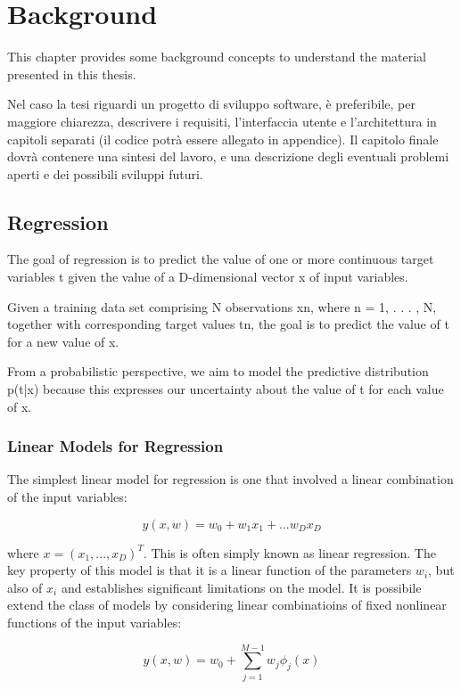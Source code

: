 \chapter{Background}
\label{chap:background}
This chapter provides some background concepts to understand the material 
presented in this thesis. 

Nel caso la tesi riguardi un progetto di sviluppo software,
è preferibile, per maggiore chiarezza, descrivere i requisiti, l’interfaccia utente e
l’architettura in capitoli separati (il codice potrà essere allegato in appendice). Il capitolo
finale dovrà contenere una sintesi del lavoro, e una descrizione degli eventuali problemi
aperti e dei possibili sviluppi futuri.

\section{Regression}
The goal of regression is to predict the value of one or more continuous target variables t given the value of a D-dimensional vector x of input variables.

Given a training data set comprising N observations {xn}, where n = 1, . . . , N,
together with corresponding target values {tn}, the goal is to predict the value of t
for a new value of x.

From a probabilistic perspective, we aim to model the predictive distribution p(t|x) because this expresses
our uncertainty about the value of t for each value of x.

\subsection{Linear Models for Regression}
\label{subsec:reglinuniv}

The simplest linear model for regression is one that involved a linear combination of the input variables:
\begin{Equation}[!h]
	\centering
	\begin{equation}
	y(x,w)=w_0 + w_1x_1+...w_D x_D
	\end{equation}
	\label{eq:mathmodela}
\end{Equation}

where $x=(x_1,...,x_D)^T$. This is often simply known as linear regression. The key property of this model is that it is a linear function of the parameters $w_i$, but also of $x_i$ and establishes significant limitations on the model. It is possibile extend the class of models by considering linear combinatioins of fixed nonlinear functions of the input variables:
\begin{Equation}[!h]
	\centering
	\begin{equation}
	y(x,w)=w_0 + \sum_{j=1}^{M-1}w_j \phi_j(x)
	\end{equation}
	\label{eq:mathmodela}
\end{Equation}


